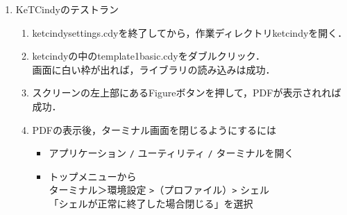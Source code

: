 \documentclass{ujarticle}
\begin{document}
\begin{enumerate}[\bf\large 1.]
  \item KeTCindyのテストラン
    \begin{enumerate}[(1)]
    \item ketcindysettings.cdyを終了してから，作業ディレクトリketcindyを開く．
    \item ketcindyの中のtemplate1basic.cdyをダブルクリック．\\
      \hspace*{10mm}画面に白い枠が出れば，ライブラリの読み込みは成功．
    \item スクリーンの左上部にあるFigureボタンを押して，PDFが表示されれば成功．
    \item PDFの表示後，ターミナル画面を閉じるようにするには
       \begin{itemize}
        \item アプリケーション \verb|/| ユーティリティ \verb|/| ターミナルを開く
        \item トップメニューから\\
          \hspace*{5mm}ターミナル＞環境設定 \verb|>|（プロファイル）\verb|>| シェル\\
          \hspace*{10mm}「シェルが正常に終了した場合閉じる」を選択
        \end{itemize}
  \end{enumerate}


\end{enumerate}
\end{document}
